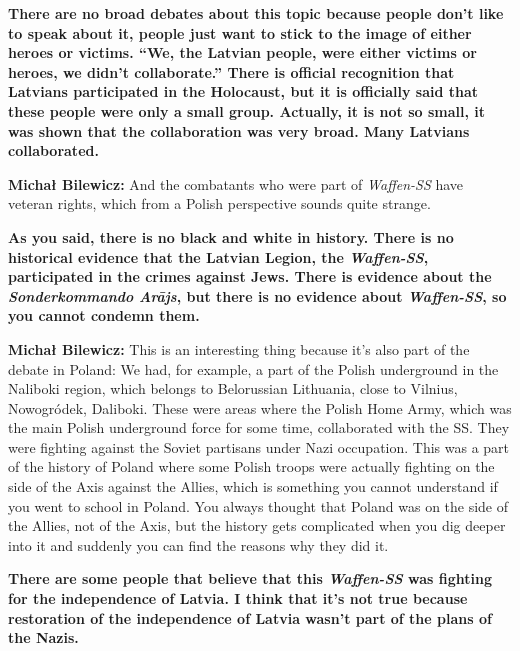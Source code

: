 \textbf{There are no broad debates about this topic because people don't like to speak about it, people just want to stick to the image of either heroes or victims. ``We, the Latvian people, were either victims or heroes,  we didn’t collaborate.'' There is official recognition that Latvians participated in the Holocaust, but it is officially said that these people were only a small group. Actually, it is not so small, it was shown that the collaboration was very broad. Many Latvians collaborated.} 

\textbf{Michał Bilewicz:} And the combatants who were part of \textit{Waffen-SS} have veteran rights, which from a Polish perspective sounds quite strange. 

\textbf{As you said, there is no black and white in history. There is no historical evidence that the Latvian Legion, the \textit{Waffen-SS}, participated in the crimes against Jews. There is evidence about the \textit{Sonderkommando Arājs}, but there is no evidence about \textit{Waffen-SS}, so you cannot condemn them.}

\textbf{Michał Bilewicz:} This is an interesting thing because it's also part of the debate in Poland: We had, for example, a part of the Polish underground in the Naliboki region, which belongs to Belorussian Lithuania, close to Vilnius, Nowogródek, Daliboki. These were areas where the Polish Home Army, which was the main Polish underground force for some time, collaborated with the SS. They were fighting against the Soviet partisans under Nazi occupation. This was a part of the history of Poland where some Polish troops were actually fighting on the side of the Axis against the Allies, which is something you cannot understand if you went to school in Poland. You always thought that Poland was on the side of the Allies, not of the Axis, but the history gets complicated when you dig deeper into it and suddenly you can find the reasons why they did it. 

\textbf{There are some people that believe that this \textit{Waffen-SS} was fighting for the independence of Latvia. I think that it’s not true because restoration of the independence of Latvia wasn't part of the plans of the Nazis.} 


